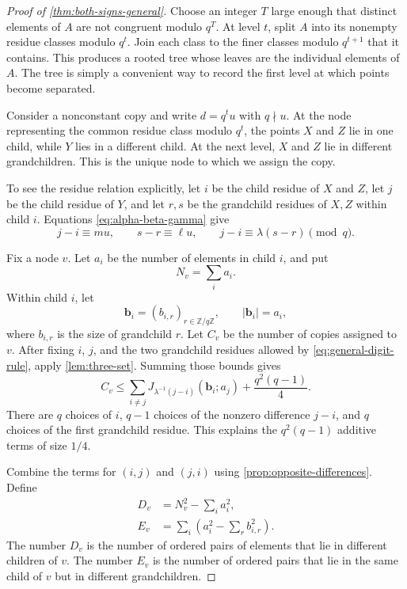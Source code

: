 \documentclass[11pt]{article}
\numberwithin{equation}{section}
\theoremstyle{remark}
\newcommand{\Fq}{\mathbb Z/q\mathbb Z}
\begin{document}
\begin{proof}[Proof of \cref{thm:both-signs-general}]
Choose an integer $T$ large enough that distinct elements of $A$ are not
congruent modulo $q^T$.  At level $t$, split $A$ into its nonempty residue
classes modulo $q^t$.  Join each class to the finer classes modulo
$q^{t+1}$ that it contains.  This produces a rooted tree whose leaves are
the individual elements of $A$.  The tree is simply a convenient way to record the first level at which
points become separated.

Consider a nonconstant copy and write $d=q^tu$ with $q\nmid u$.  At the
node representing the common residue class modulo $q^t$, the points $X$ and
$Z$ lie in one child, while $Y$ lies in a different child.  At the next
level, $X$ and $Z$ lie in different grandchildren.  This is the unique node
to which we assign the copy.

To see the residue relation explicitly, let $i$ be the child residue of
$X$ and $Z$, let $j$ be the child residue of $Y$, and let $r,s$ be the
grandchild residues of $X,Z$ within child $i$.  Equations
\eqref{eq:alpha-beta-gamma} give
\begin{equation}\label{eq:general-digit-rule}
 j-i\equiv mu,
 \qquad
 s-r\equiv\ell u,
 \qquad
 j-i\equiv\lambda(s-r)\pmod q.
\end{equation}

Fix a node $v$.  Let $a_i$ be the number of elements in child $i$, and put
\[
 N_v=\sum_i a_i.
\]
Within child $i$, let
\[
 \mathbf b_i=(b_{i,r})_{r\in\Fq},
 \qquad |\mathbf b_i|=a_i,
\]
where $b_{i,r}$ is the size of grandchild $r$.  Let $C_v$ be the number of
copies assigned to $v$.  After fixing $i$, $j$, and the two grandchild
residues allowed by \eqref{eq:general-digit-rule}, apply
\cref{lem:three-set}.  Summing those bounds gives
\begin{equation}\label{eq:copies-at-node}
 C_v
 \le
 \sum_{i\ne j}
 J_{\lambda^{-1}(j-i)}(\mathbf b_i;a_j)
 +\frac{q^2(q-1)}4.
\end{equation}
There are $q$ choices of $i$, $q-1$ choices of the nonzero difference
$j-i$, and $q$ choices of the first grandchild residue.  This explains the
$q^2(q-1)$ additive terms of size $1/4$.

Combine the terms for $(i,j)$ and $(j,i)$ using
\cref{prop:opposite-differences}.  Define
\begin{align}
 D_v&=N_v^2-\sum_i a_i^2,
 \label{eq:def-general-D}\\
 E_v&=\sum_i\left(a_i^2-\sum_r b_{i,r}^2\right).
 \label{eq:def-general-E}
\end{align}
The number $D_v$ is the number of ordered pairs of elements that lie in
different children of $v$.  The number $E_v$ is the number of ordered pairs
that lie in the same child of $v$ but in different grandchildren.


\end{proof}
\end{document}
